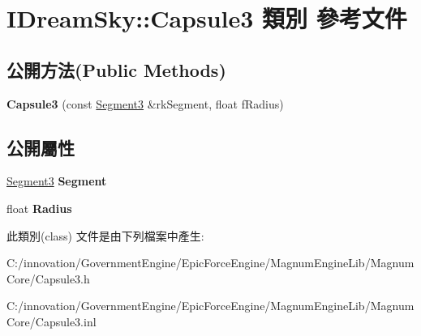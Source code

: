 \hypertarget{class_i_dream_sky_1_1_capsule3}{}\section{I\+Dream\+Sky\+:\+:Capsule3 類別 參考文件}
\label{class_i_dream_sky_1_1_capsule3}
\subsection*{公開方法(Public Methods)}
\begin{DoxyCompactItemize}
\item 
{\bfseries Capsule3} (const \hyperlink{class_i_dream_sky_1_1_segment3}{Segment3} \&rk\+Segment, float f\+Radius)\hypertarget{class_i_dream_sky_1_1_capsule3_ad4f6700cfc90c1843440112a5c2df7cb}{}\label{class_i_dream_sky_1_1_capsule3_ad4f6700cfc90c1843440112a5c2df7cb}

\end{DoxyCompactItemize}
\subsection*{公開屬性}
\begin{DoxyCompactItemize}
\item 
\hyperlink{class_i_dream_sky_1_1_segment3}{Segment3} {\bfseries Segment}\hypertarget{class_i_dream_sky_1_1_capsule3_a406d9de5f47f3e2265b3a2f051c54ad6}{}\label{class_i_dream_sky_1_1_capsule3_a406d9de5f47f3e2265b3a2f051c54ad6}

\item 
float {\bfseries Radius}\hypertarget{class_i_dream_sky_1_1_capsule3_aee75f89fdea1cce9d142bd2f8b268196}{}\label{class_i_dream_sky_1_1_capsule3_aee75f89fdea1cce9d142bd2f8b268196}

\end{DoxyCompactItemize}


此類別(class) 文件是由下列檔案中產生\+:\begin{DoxyCompactItemize}
\item 
C\+:/innovation/\+Government\+Engine/\+Epic\+Force\+Engine/\+Magnum\+Engine\+Lib/\+Magnum\+Core/Capsule3.\+h\item 
C\+:/innovation/\+Government\+Engine/\+Epic\+Force\+Engine/\+Magnum\+Engine\+Lib/\+Magnum\+Core/Capsule3.\+inl\end{DoxyCompactItemize}
